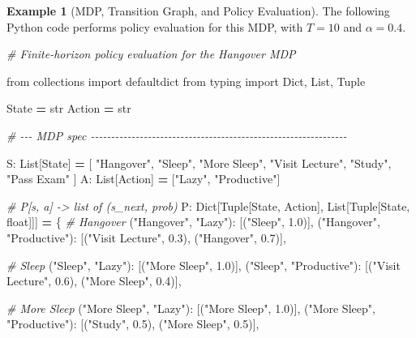 \documentclass[
]{book}
\newenvironment{Shaded}{\begin{snugshade}}{\end{snugshade}}
\newcommand{\BuiltInTok}[1]{#1}
\newcommand{\CommentTok}[1]{\textcolor[rgb]{0.56,0.35,0.01}{\textit{#1}}}
\newcommand{\FloatTok}[1]{\textcolor[rgb]{0.00,0.00,0.81}{#1}}
\newcommand{\ImportTok}[1]{#1}
\newcommand{\NormalTok}[1]{#1}
\newcommand{\OperatorTok}[1]{\textcolor[rgb]{0.81,0.36,0.00}{\textbf{#1}}}
\newcommand{\StringTok}[1]{\textcolor[rgb]{0.31,0.60,0.02}{#1}}
\theoremstyle{definition}
\theoremstyle{definition}
\newtheorem{example}{Example}[chapter]
\theoremstyle{definition}
\theoremstyle{definition}
\theoremstyle{remark}
\begin{document}
\begin{example}[MDP, Transition Graph, and Policy Evaluation]
The following Python code performs policy evaluation for this MDP, with \(T=10\) and \(\alpha = 0.4\).

\begin{Shaded}
\begin{Highlighting}[]
\CommentTok{\# Finite{-}horizon policy evaluation for the Hangover MDP}

\ImportTok{from}\NormalTok{ collections }\ImportTok{import}\NormalTok{ defaultdict}
\ImportTok{from}\NormalTok{ typing }\ImportTok{import}\NormalTok{ Dict, List, Tuple}

\NormalTok{State }\OperatorTok{=} \BuiltInTok{str}
\NormalTok{Action }\OperatorTok{=} \BuiltInTok{str}

\CommentTok{\# {-}{-}{-} MDP spec {-}{-}{-}{-}{-}{-}{-}{-}{-}{-}{-}{-}{-}{-}{-}{-}{-}{-}{-}{-}{-}{-}{-}{-}{-}{-}{-}{-}{-}{-}{-}{-}{-}{-}{-}{-}{-}{-}{-}{-}{-}{-}{-}{-}{-}{-}{-}{-}{-}{-}{-}{-}{-}{-}{-}{-}{-}{-}{-}{-}{-}{-}{-}}

\NormalTok{S: List[State] }\OperatorTok{=}\NormalTok{ [}
    \StringTok{"Hangover"}\NormalTok{, }\StringTok{"Sleep"}\NormalTok{, }\StringTok{"More Sleep"}\NormalTok{, }\StringTok{"Visit Lecture"}\NormalTok{, }\StringTok{"Study"}\NormalTok{, }\StringTok{"Pass Exam"}
\NormalTok{]}
\NormalTok{A: List[Action] }\OperatorTok{=}\NormalTok{ [}\StringTok{"Lazy"}\NormalTok{, }\StringTok{"Productive"}\NormalTok{]}

\CommentTok{\# P[s, a] {-}\textgreater{} list of (s\_next, prob)}
\NormalTok{P: Dict[Tuple[State, Action], List[Tuple[State, }\BuiltInTok{float}\NormalTok{]]] }\OperatorTok{=}\NormalTok{ \{}
    \CommentTok{\# Hangover}
\NormalTok{    (}\StringTok{"Hangover"}\NormalTok{, }\StringTok{"Lazy"}\NormalTok{):       [(}\StringTok{"Sleep"}\NormalTok{, }\FloatTok{1.0}\NormalTok{)],}
\NormalTok{    (}\StringTok{"Hangover"}\NormalTok{, }\StringTok{"Productive"}\NormalTok{): [(}\StringTok{"Visit Lecture"}\NormalTok{, }\FloatTok{0.3}\NormalTok{), (}\StringTok{"Hangover"}\NormalTok{, }\FloatTok{0.7}\NormalTok{)],}

    \CommentTok{\# Sleep}
\NormalTok{    (}\StringTok{"Sleep"}\NormalTok{, }\StringTok{"Lazy"}\NormalTok{):          [(}\StringTok{"More Sleep"}\NormalTok{, }\FloatTok{1.0}\NormalTok{)],}
\NormalTok{    (}\StringTok{"Sleep"}\NormalTok{, }\StringTok{"Productive"}\NormalTok{):    [(}\StringTok{"Visit Lecture"}\NormalTok{, }\FloatTok{0.6}\NormalTok{), (}\StringTok{"More Sleep"}\NormalTok{, }\FloatTok{0.4}\NormalTok{)],}

    \CommentTok{\# More Sleep}
\NormalTok{    (}\StringTok{"More Sleep"}\NormalTok{, }\StringTok{"Lazy"}\NormalTok{):       [(}\StringTok{"More Sleep"}\NormalTok{, }\FloatTok{1.0}\NormalTok{)],}
\NormalTok{    (}\StringTok{"More Sleep"}\NormalTok{, }\StringTok{"Productive"}\NormalTok{): [(}\StringTok{"Study"}\NormalTok{, }\FloatTok{0.5}\NormalTok{), (}\StringTok{"More Sleep"}\NormalTok{, }\FloatTok{0.5}\NormalTok{)],}


\end{Highlighting}
\end{Shaded}
\end{example}
\end{document}
